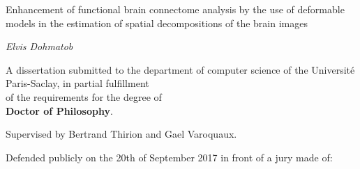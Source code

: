 \documentclass[nobib, a4paper, notoc, twoside, justified, openany]{tufte-book}
\begin{document}
\begin{titlepage}
\begin{fullwidth}
\begin{center}

\vspace{2pc}
{ \Huge
{\color{msblue} {Enhancement of functional brain connectome analysis by the use of deformable
models in the estimation of spatial decompositions of the brain images}} \\[0.5cm]
}




\vspace{3pc}
{\Huge \it Elvis Dohmatob} \\

\vspace{3pc}



{\LARGE A dissertation submitted to the department of computer science of the Universit\'e Paris-Saclay, in partial fulfillment
  \\of the requirements for the degree of \\  \vspace{10pt} 
  \textbf{Doctor of Philosophy}.}\\
\vspace{1pc}

{\LARGE Supervised by {Bertrand Thirion} and {Gael Varoquaux}.}


\vspace{2pc}
{\LARGE Defended publicly on the 20th of September 2017 in front of a jury made of:}
\vspace{2pc}



\end{center}
\end{fullwidth}
\end{titlepage}
\end{document}
